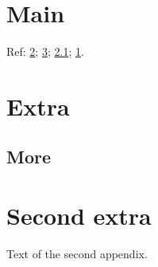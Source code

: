 \documentclass{report}
\begin{document}
\chapter{Main}\label{main}
Ref: \ref{app:a}; \ref{app:b}; \ref{sec:a}; \ref{main}.
\begin{appendices}
\chapter{Extra}\label{app:a}
\section{More}\label{sec:a}
\chapter{Second extra}\label{app:b}
Text of the second appendix.
\end{appendices}
\end{document}
